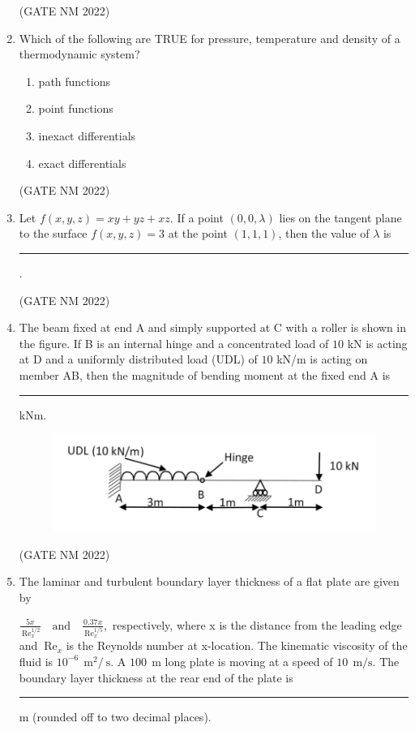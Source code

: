 \documentclass[journal,12pt,onecolumn]{IEEEtran}
\theoremstyle{remark}
\begin{document}
\begin{enumerate}
\hfill(GATE NM 2022)

\item  Which of the following are TRUE for pressure, temperature and density of a thermodynamic system?
	\begin{multicols}{2}
\begin{enumerate}
    \item path functions
    \item point functions
    \item inexact differentials
    \item exact differentials
\end{enumerate}
	\end{multicols}

\hfill(GATE NM 2022)

\item  Let $ f(x, y, z) = xy + yz + xz . $ If a point $ (0, 0, \lambda) $ lies on the tangent plane to the surface  
$f(x, y, z) = 3$
at the point $ (1, 1, 1) $, then the value of $ \lambda $ is \rule{3cm}{0.15mm} .

\hfill(GATE NM 2022)

\item  The beam fixed at end A and simply supported at C with a roller is shown in the figure.  
	If B  is an internal hinge and a concentrated load of $10$ kN is acting at D and a uniformly distributed load (UDL) of $10$ kN/m  is acting on member AB, then the magnitude of bending moment at the fixed end A is \rule{3cm}{0.15mm} kNm.
\begin{figure}[h]
	\centering
    \includegraphics[width=0.3\columnwidth]{fig4}
	\caption{}
	\label{fig:placeholder}
\end{figure}

\hfill(GATE NM 2022)

\item  The laminar and turbulent boundary layer thickness of a flat plate are given by  

$\frac{5x}{\ \text{Re}_x^{1/2}}
\quad \text{and} \quad
\frac{0.37x}{\ \text{Re}_x^{1/5}},$
respectively, where x is the distance from the leading edge and $\ \text{Re}_x$ is the Reynolds number at x-location.  
The kinematic viscosity of the fluid is $10^{-6}~\ \text{m}^2/\ \text{s}$.  
A $100~\ \text{m}$  long plate is moving at a speed of $10~\ \text{m/s}$.  
The boundary layer thickness at the rear end of the plate is \rule{3cm}{0.15mm}  m (rounded off to two decimal places).


\end{enumerate}
\end{document}
